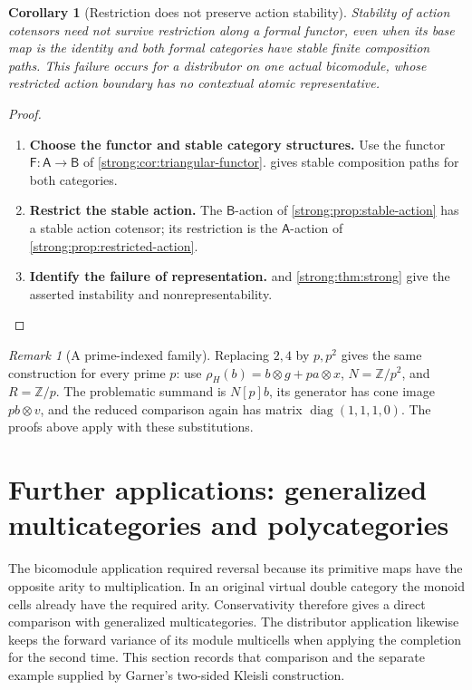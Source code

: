 \documentclass[11pt,reqno]{amsart}
\theoremstyle{plain}
\newtheorem{corollary}[theorem]{Corollary}
\theoremstyle{definition}
\theoremstyle{remark}
\newtheorem{remark}[theorem]{Remark}
\numberwithin{equation}{section}
\newcommand{\Z}{\mathbb Z}
\begin{document}
\begin{corollary}[Restriction does not preserve action stability]\label{strong:cor:failure}
Stability of action cotensors need not survive restriction along a
formal functor, even when its base map is the identity and both formal
categories have stable finite composition paths. This failure occurs
for a distributor on one actual bicomodule, whose restricted action
boundary has no contextual atomic representative.
\end{corollary}
\begin{proof}\leavevmode
\begin{enumerate}
\item \textbf{Choose the functor and stable category structures.} Use the functor $\mathsf F:\mathsf A\to\mathsf B$ of
\cref{strong:cor:triangular-functor}.  gives
stable composition paths for both categories.

\item \textbf{Restrict the stable action.} The $\mathsf B$-action
of \cref{strong:prop:stable-action} has a stable action cotensor;
its restriction is the $\mathsf A$-action of
\cref{strong:prop:restricted-action}.

\item \textbf{Identify the failure of representation.} 
and \cref{strong:thm:strong} give the asserted instability and
nonrepresentability.\qedhere
\end{enumerate}
\end{proof}

\begin{remark}[A prime-indexed family]
Replacing $2,4$ by $p,p^2$ gives the same construction for every prime
$p$: use $\rho_H(b)=b\otimes g+pa\otimes x$, $N=\Z/p^2$, and
$R=\Z/p$. The problematic summand is $N[p]b$, its generator has
cone image $pb\otimes v$, and the reduced comparison again has matrix
$\operatorname{diag}(1,1,1,0)$. The proofs above apply with these
substitutions.
\end{remark}

\section{Further applications: generalized multicategories and polycategories}\label{sec:kleisli}

The bicomodule application required reversal because its primitive maps
have the opposite arity to multiplication. In an original virtual double
category the monoid cells already have the required arity. Conservativity
therefore gives a direct comparison with generalized multicategories.
The distributor application likewise keeps the forward variance of its
module multicells when applying the completion for the second time.
This section records that comparison and the separate example supplied by
Garner's two-sided Kleisli construction.
\end{document}
